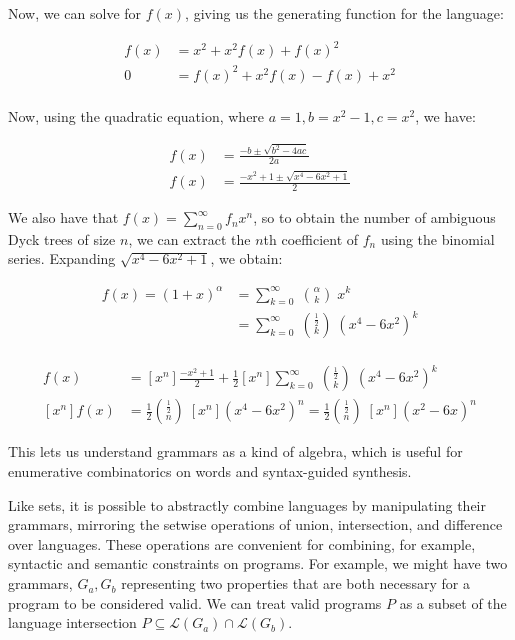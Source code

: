 \noindent Now, we can solve for $f(x)$, giving us the generating function for the language:

\begin{align*}
  f(x) &= x^2 + x^2 f(x) + f(x)^2\\
  0 &= f(x)^2 + x^2 f(x) - f(x) + x^2\\
\end{align*}

\noindent Now, using the quadratic equation, where $a = 1, b = x^2 - 1, c = x^2$, we have:

\begin{align*}
  f(x) &= \frac{-b \pm \sqrt{b^2 - 4ac}}{2a} \\
  f(x) &= \frac{-x^2 + 1 \pm \sqrt{x^4 - 6x^2 + 1}}{2}
\end{align*}

\noindent We also have that $f(x)=\sum _{n=0}^{\infty }f_nx^{n}$, so to obtain the number of ambiguous Dyck trees of size $n$, we can extract the $n$th coefficient of $f_n$ using the binomial series. Expanding $\sqrt{x^4 - 6x^2 + 1}$, we obtain:

\begin{align*}
f(x) = (1+x)^{\alpha }&=\sum _{k=0}^{\infty }\;{\binom {\alpha }{k}}\;x^{k}\\
  &=\sum _{k=0}^{\infty }\;{\binom {\frac{1}{2} }{k}}\;(x^4 - 6x^2)^{k}\\
\end{align*}

\begin{align*}
  [x^n]f(x) &= [x^n]\frac{-x^2 + 1}{2} + \frac{1}{2}[x^n]\sum _{k=0}^{\infty }\;{\binom {\frac{1}{2} }{k}}\;(x^4 - 6x^2)^{k}\\
  [x^n]f(x) &= \frac{1}{2}{\binom {\frac{1}{2} }{n}}\;[x^n](x^4 - 6x^2)^n = \frac{1}{2}{\binom {\frac{1}{2} }{n}}\;[x^n](x^2 - 6x)^n
\end{align*}

This lets us understand grammars as a kind of algebra, which is useful for enumerative combinatorics on words and syntax-guided synthesis.



Like sets, it is possible to abstractly combine languages by manipulating their grammars, mirroring the setwise operations of union, intersection, and difference over languages. These operations are convenient for combining, for example, syntactic and semantic constraints on programs. For example, we might have two grammars, $G_a, G_b$ representing two properties that are both necessary for a program to be considered valid. We can treat valid programs $P$ as a subset of the language intersection $P \subseteq \mathcal{L}(G_a) \cap \mathcal{L}(G_b)$.

